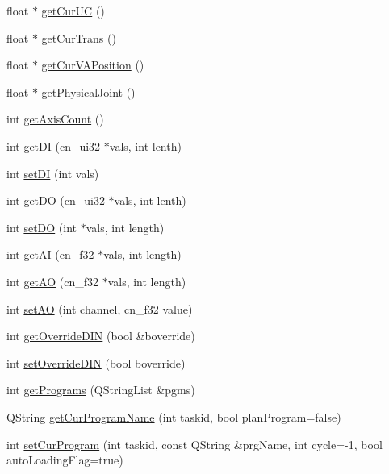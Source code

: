 \begin{DoxyCompactItemize}
float $\ast$ \hyperlink{classCUIApp_ad51349f53d180797ac563eee94b14305}{get\-Cur\-U\-C} ()
\item 
float $\ast$ \hyperlink{classCUIApp_a3644d18cbd1ba30478da55a8c36d759e}{get\-Cur\-Trans} ()
\item 
float $\ast$ \hyperlink{classCUIApp_a1d7f8fbb63c50f39d49a7b74b8df41e6}{get\-Cur\-V\-A\-Position} ()
\item 
float $\ast$ \hyperlink{classCUIApp_a6b09f14f5945d44728c84e4717a95aa6}{get\-Physical\-Joint} ()
\item 
int \hyperlink{classCUIApp_a01e8913a5caef79b31a1ca5f5473d406}{get\-Axis\-Count} ()
\item 
int \hyperlink{classCUIApp_add27a97e06315b685aabb293b4e9652f}{get\-D\-I} (cn\-\_\-ui32 $\ast$vals, int lenth)
\item 
int \hyperlink{classCUIApp_aa663db4584639c16d6fad80199d7b548}{set\-D\-I} (int vals)
\item 
int \hyperlink{classCUIApp_ade6a8c4817b025076a76d5d1c36c8f7a}{get\-D\-O} (cn\-\_\-ui32 $\ast$vals, int lenth)
\item 
int \hyperlink{classCUIApp_a994ecfe4ec23e565c0a7be4100867aa8}{set\-D\-O} (int $\ast$vals, int length)
\item 
int \hyperlink{classCUIApp_a15a6be8b534004d69462e879ca47d2cf}{get\-A\-I} (cn\-\_\-f32 $\ast$vals, int length)
\item 
int \hyperlink{classCUIApp_ab1953f84d2678e22425bdf2a77d721b7}{get\-A\-O} (cn\-\_\-f32 $\ast$vals, int length)
\item 
int \hyperlink{classCUIApp_aec709af257dd9baac1a891f3495902a3}{set\-A\-O} (int channel, cn\-\_\-f32 value)
\item 
int \hyperlink{classCUIApp_adef4e805121b59f9457b4ddf16aecbf8}{get\-Override\-D\-I\-N} (bool \&boverride)
\item 
int \hyperlink{classCUIApp_a1145d1a8d1db9391696cccecdee904d0}{set\-Override\-D\-I\-N} (bool boverride)
\item 
int \hyperlink{classCUIApp_ac5c2c5f0cebb36c358dc938a6eaaef6a}{get\-Programs} (Q\-String\-List \&pgms)
\item 
Q\-String \hyperlink{classCUIApp_a369cfe1db4b1f3d93e8f39ce9e3160e6}{get\-Cur\-Program\-Name} (int taskid, bool plan\-Program=false)
\item 
int \hyperlink{classCUIApp_a248c0a953c6af72b5419d7b001b5dd39}{set\-Cur\-Program} (int taskid, const Q\-String \&prg\-Name, int cycle=-\/1, bool auto\-Loading\-Flag=true)
\item 

\end{DoxyCompactItemize}
